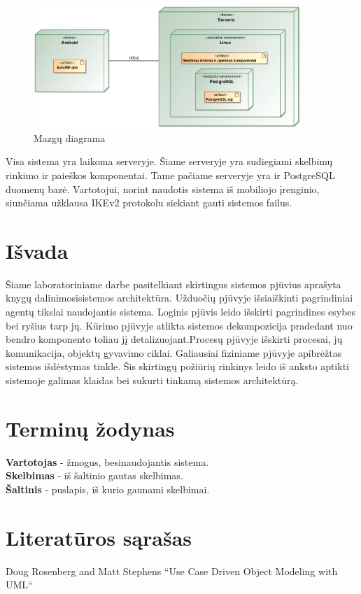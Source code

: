 \documentclass[12pt]{article}
\begin{document}
	\begin{figure}[h]
		\begin{center}
			\includegraphics[width=0.9\textwidth]{Mazgai.eps}
			\caption{Mazgų diagrama\label{Cube}}
		\end{center}
	\end{figure}
	
	Visa sistema yra laikoma serveryje. Šiame serveryje yra sudiegiami skelbimų rinkimo ir paieškos komponentai. Tame pačiame serveryje yra ir PostgreSQL duomenų bazė. Vartotojui, norint naudotis sistema iš mobiliojo įrenginio, siunčiama užklausa IKEv2 protokolu siekiant gauti sistemos failus.
	\pagebreak
	
	
	\section*{Išvada}
	Šiame laboratoriniame darbe pasitelkiant skirtingus sistemos pjūvius aprašyta knygų dalinimosisistemos architektūra. Užduočių pjūvyje išsiaiškinti pagrindiniai agentų tikslai naudojantis sistema. Loginis pjūvis leido išskirti pagrindines esybes bei ryšius tarp jų. Kūrimo pjūvyje atlikta sistemos dekompozicija pradedant nuo bendro komponento toliau jį detalizuojant.Procesų pjūvyje išskirti procesai, jų komunikacija, objektų gyvavimo ciklai. Galiausiai fiziniame pjūvyje apibrėžtas sistemos išdėstymas tinkle. Šis skirtingų požiūrių rinkinys leido iš anksto aptikti sistemoje galimas klaidas bei sukurti tinkamą sistemos architektūrą.
	\pagebreak

	\section*{Terminų žodynas}
	
	\bigskip
	\textbf{Vartotojas} - žmogus, besinaudojantis sistema.\\
	
	\textbf{Skelbimas} - iš šaltinio gautas skelbimas.\\
	
	\textbf{Šaltinis} - puslapis, iš kurio gaunami skelbimai.\\
	\pagebreak

	\section*{Literatūros sąrašas}
	
	Doug Rosenberg and Matt Stephens “Use Case Driven Object Modeling with UML“
\end{document}

